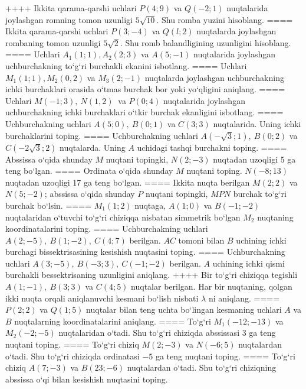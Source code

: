 ++++
Ikkita qarama-qarshi uchlari \(P (4;9) \) va \(Q (-2; 1) \) nuqtalarida joylashgan romning tomon uzunligi \(5\sqrt{10}\). Shu
romba yuzini hisoblang.
====
Ikkita qarama-qarshi uchlari $P (3; -4) $ va $Q (l;2) $ nuqtalarda joylashgan rombaning tomon uzunligi \(5\sqrt{2}\). Shu romb balandligining uzunligini hisoblang.
====
Uchlari $A_1 (1; 1), A_2 (2; 3) $ va $A (5;-1) $
nuqtalarida joylashgan uchburchakning to‘g‘ri burchakli ekanini isbotlang.
====
Uchlari \(M_{1} (1;1), M_{2} (0,2) \) va
\(M_{3} (2;-1) \) nuqtalarda joylashgan uchburchakning ichki 
burchaklari orasida o‘tmas burchak bor yoki yo‘qligini aniqlang.
====
Uchlari \(M (-1;3),\ N (1,2) \ \) va \(P (0;4) \)
nuqtalarida joylashgan uchburchakning ichki burchaklari o‘tkir burchak
ekanligini isbotlang.
====
Uchburchakning uchlari \(A (5;0),\ B (0;1) \) va \(C (3;3) \)
nuqtalarida. Uning ichki burchaklarini toping.
====
Uchburchakning uchlari
\(A\left(-\sqrt{3};1 \right),\ B (0;2) \) va
\(C\left(-2\sqrt{3};2 \right) \) nuqtalarda. Uning $A$
uchidagi tashqi burchakni toping.
====
Abssissa o‘qida shunday $M$ nuqtani topingki,
\(N (2;-3) \) nuqtadan uzoqligi 5 ga teng bo‘lgan.
====
Ordinata o‘qida shunday $M$ nuqtani toping.
\(N (-8;13) \) nuqtadan uzoqligi 17 ga teng bo‘lgan.
====
Ikkita nuqta berilgan \(M (2;2) \) va \(N (5;-2) \); abssissa o‘qida shunday $P$ nuqtani topingki, $MPN$ burchak to‘g‘ri burchak bo‘lsin.
====
\(M_{1} (1;2) \) nuqtaga, \(A (1;0) \) va \(B (-1;-2) \)
nuqtalaridan o‘tuvchi to‘g‘ri chiziqqa nisbatan simmetrik bo‘lgan \(M_{2}\) nuqtaning koordinatalarini toping.
====
Uchburchakning uchlari \(A (2;-5),\ B (1;-2),\ C (4;7) \)
berilgan. $AC$ tomoni bilan $B$ uchining ichki burchagi
bissektrisasining kesishish nuqtasini toping.
====
Uchburchakning uchlari
\(A (3;-5),\ B (-3;3),\ C (-1;-2) \) berilgan. $A$ uchining ichki qismi
burchakli bessektrisaning uzunligini aniqlang.
++++
Bir to‘g‘ri chiziqqa tegishli \(A (1;-1),\ B (3;3) \) va
\(C (4;5) \) nuqtalar berilgan. Har bir nuqtaning, qolgan ikki nuqta orqali aniqlanuvchi kesmani bo‘lish nisbati $\lambda$ ni aniqlang.
====
\(P (2;2) \) va \(Q (1;5) \) nuqtalar bilan teng uchta
bo‘lingan kesmaning uchlari $A$ va $B$ nuqtalarning
koordinatalarini aniqlang.
====
To‘g‘ri \(M_{1} (-12;-13) \) va \(M_{2} (-2;-5) \)
nuqtalaridan o‘tadi. Shu to‘g‘ri chiziqda abssissasi 3 ga teng nuqtani toping.
====
To‘g‘ri chiziq \(M (2;-3) \) va \(N (-6;5) \) nuqtalardan o‘tadi.
Shu to‘g‘ri chiziqda ordinatasi $-5$ ga teng nuqtani toping.
====
To‘g‘ri chiziq \(A (7;-3) \) va \(B (23;-6) \) nuqtalardan o‘tadi.
Shu to‘g‘ri chiziqning abssissa o‘qi bilan kesishish nuqtasini toping.
